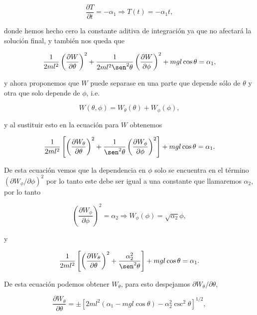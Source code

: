 \documentclass[a4paper,10pt]{article}
\numberwithin{equation}{section}
\begin{document}
\begin{equation}
 \frac{\partial T}{\partial t} = - \alpha_1 \Rightarrow 
 T(t) = - \alpha_1 t,
\end{equation}

donde hemos hecho cero la constante aditiva de integración ya que no afectará la 
solución final, y también nos queda que 

\begin{equation}
 \frac{1}{2ml^2}\left(\frac{\partial W}{\partial \theta} \right)^2 
 + \frac{1}{2ml^2\sen^2{\theta}}\left(\frac{\partial W}{\partial \phi} \right)^2 
 + mgl\cos{\theta} = \alpha_1,
\end{equation}

y ahora proponemos que $W$ puede separase en una parte que depende sólo de $\theta$ 
y otra que solo depende de $\phi$, i.e. 

\begin{equation}
 W(\theta,\phi) = W_\theta(\theta) + W_\phi(\phi),
\end{equation}

y al sustituir esto en la ecuación para $W$ obtenemos 

\begin{equation}
 \frac{1}{2ml^2}\left[\left(\frac{\partial W_\theta}{\partial \theta} \right)^2 
 + \frac{1}{\sen^2{\theta}}\left(\frac{\partial W_\phi}{\partial \phi} \right)^2\right]
 + mgl\cos{\theta} = \alpha_1.
\end{equation}

De esta ecuación vemos que la dependencia en $\phi$ solo se encuentra en el término 
$(\partial W_\phi/\partial \phi)^2$ por lo tanto este debe ser igual a una constante 
que llamaremos $\alpha_2$, por lo tanto 

\begin{equation}
 \left(\frac{\partial W_\phi}{\partial \phi}\right)^2 = \alpha_2 \Rightarrow 
 W_\phi(\phi) = \sqrt{\alpha_2}\phi,
\end{equation}

y

\begin{equation}
 \frac{1}{2ml^2}\left[\left(\frac{\partial W_\theta}{\partial \theta} \right)^2 
 + \frac{\alpha_2^2}{\sen^2{\theta}}\right]
 + mgl\cos{\theta} = \alpha_1.
\end{equation}

De esta ecuación podemos obtener $W_\theta$, para esto despejamos 
$\partial W_\theta/\partial \theta$,

\begin{equation}
 \frac{\partial W_\theta}{\partial \theta} = \pm \left[
 2ml^2(\alpha_1 - mgl\cos{\theta}) -  \alpha_2^2\csc^2{\theta}\right]^{1/2},
\end{equation}
\end{document}
